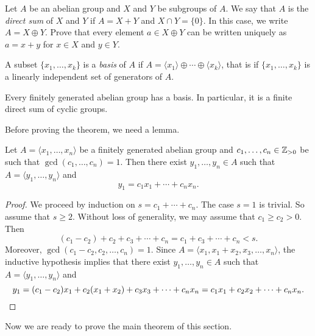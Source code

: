 \begin{exercise}
    Let $A$ be an abelian group and $X$ and $Y$ be subgroups of $A$. 
    We say that $A$ is the \emph{direct sum} of $X$ and $Y$ 
    if $A=X+Y$ and $X\cap Y=\{0\}$. In this case, we write $A=X\oplus Y$. Prove that 
    every element $a\in X\oplus Y$ can be
    written uniquely as $a=x+y$ for $x\in X$ and $y\in Y$.     
\end{exercise}

A subset $\{x_1,\dots,x_k\}$ is a \emph{basis} of $A$ 
if $A=\langle x_1\rangle\oplus\cdots\oplus \langle x_k\rangle$, that is
if $\{x_1,\dots,x_k\}$ is a 
linearly independent set of generators of $A$. 


\begin{theorem}
\label{thm:fundamental_abelian}
    Every finitely generated abelian group has a basis. In particular, 
    it is a finite direct sum of cyclic groups. 
\end{theorem}

Before proving the theorem, we need a lemma.

\begin{lemma}
\label{lem:trick_abelian}
    Let $A=\langle x_1,\dots,x_n\rangle$ be a finitely generated 
    abelian group and $c_1,\dots,c_n\in\mathbb{Z}_{>0}$ be such that 
    $\gcd(c_1,\dots,c_n)=1$. Then there exist $y_1,\dots,y_n\in A$ 
    such that 
    $A=\langle y_1,\dots,y_n\rangle$ and 
    \[ 
    y_1=c_1x_1+\cdots+c_nx_n.
    \]
\end{lemma}

\begin{proof}
    We proceed by induction on $s=c_1+\cdots+c_n$. The case $s=1$ is trivial. 
    So assume that $s\geq2$. Without loss of generality, we may assume that 
    $c_1\geq c_2>0$. Then 
    \[ 
    (c_1-c_2)+c_2+c_3+\cdots+c_n=c_1+c_3+\cdots+c_n<s.
    \]
    Moreover, $\gcd(c_1-c_2,c_2,\dots,c_n)=1$. Since $A=\langle x_1,x_1+x_2,x_3,\dots,x_n\rangle$, the inductive hypothesis implies that 
    there exist $y_1,\dots,y_n\in A$ such that 
    $A=\langle y_1,\dots,y_n\rangle$ and 
    \[ 
        y_1=(c_1-c_2)x_1+c_2(x_1+x_2)+c_3x_3+\cdots+c_nx_n
        =c_1x_1+c_2x_2+\cdots+c_nx_n.\qedhere
    \]
\end{proof}

Now we are ready to prove the main theorem of this section. 


